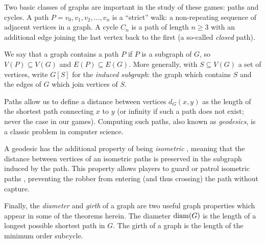 Two basic classes of graphs are important in the study of these games: paths and cycles.
A path $P = v_0, v_1, v_2, \dots , v_n$ is a ``strict'' walk: a non-repeating sequence of
adjacent vertices in a graph. A cycle $C_n$ is a path of length $n \geq 3$ with an additional edge joining the last vertex back to the first (a so-called \textit{closed} path).

We say that a graph contains a path $P$ if $P$ is a subgraph of $G$, so $V(P) \subseteq V(G)$ and $E(P) \subseteq E(G)$. More generally, with $S \subseteq V(G)$ a set of vertices, write $G[S]$ for the \textit{induced subgraph}: the graph which contains $S$ and the edges of $G$ which join vertices of $S$.

Paths allow us to define a distance between vertices $d_G(x,y)$ as the length of the shortest path connecting $x$ to $y$ (or infinity if such a path does not exist; never the case in our games). Computing such paths, also known as \textit{geodesics}, is a classic problem in computer science.

A geodesic has the additional property of being \textit{isometric} \cite{pan2006isometric}, meaning that the distance between vertices of an isometric paths is preserved in the subgraph induced by the path. This property allows players to guard or patrol isometric paths \cite{aigner1984game}, preventing
the robber from entering (and thus crossing) the path without capture.

Finally, the \textit{diameter} and \textit{girth} of a graph are two useful graph properties which appear in some
of the theorems herein.
The diameter $\operatorname{diam}(G)$ is the length of a longest possible shortest path in $G$. The girth of a graph is the length of the minimum order subcycle.
